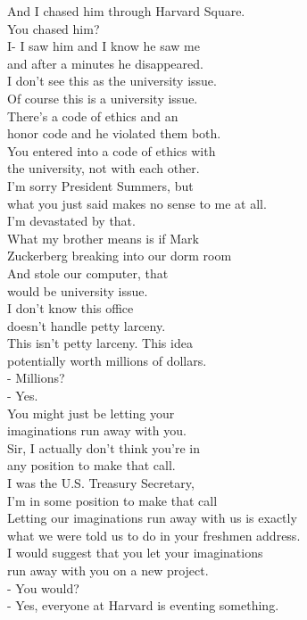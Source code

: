 \documentclass{article}
\begin{document}
\begin{multicols}{3}
And I chased him through Harvard Square.\\
You chased him?\\
I- I saw him and I know he saw me\\
and after a minutes he disappeared.\\
I don't see this as the university issue.\\
Of course this is a university issue.\\
There's a code of ethics and an\\
honor code and he violated them both.\\
You entered into a code of ethics with\\
the university, not with each other.\\
I'm sorry President Summers, but\\
what you just said makes no sense to me at all.\\
I'm devastated by that.\\
What my brother means is if Mark\\
Zuckerberg breaking into our dorm room\\
And stole our computer, that\\
would be university issue.\\
I don't know this office\\
doesn't handle petty larceny.\\
This isn't petty larceny. This idea\\
potentially worth millions of dollars.\\
- Millions?\\
- Yes.\\
You might just be letting your\\
imaginations run away with you.\\
Sir, I actually don't think you're in\\
any position to make that call.\\
I was the U.S. Treasury Secretary,\\
I'm in some position to make that call\\
Letting our imaginations run away with us is exactly\\
what we were told us to do in your freshmen address.\\
I would suggest that you let your imaginations\\
run away with you on a new project.\\
- You would?\\
- Yes, everyone at Harvard is eventing something.\\

\end{multicols}
\end{document}
